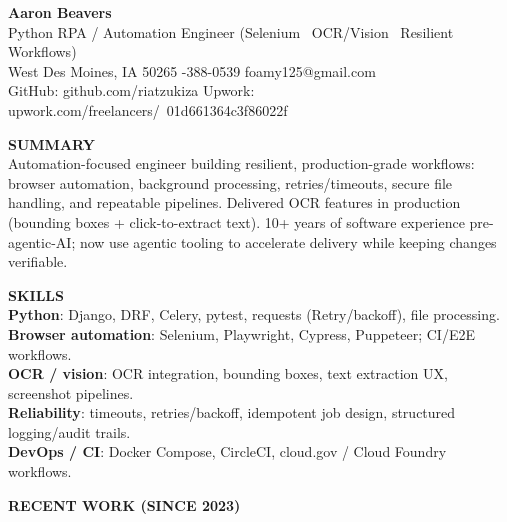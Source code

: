 \documentclass[10pt]{article}
\begin{document}
{\LARGE \textbf{Aaron Beavers}}\\
Python RPA / Automation Engineer (Selenium \textbullet\ OCR/Vision \textbullet\ Resilient Workflows)\\

West Des Moines, IA 50265 \;\;\textbar\;-388-0539 \;\;\textbar\;\; foamy125@gmail.com\\
GitHub: github.com/riatzukiza \;\;\textbar\;\; Upwork: upwork.com/freelancers/~01d661364c3f86022f

\vspace{6pt}
\textbf{SUMMARY}\\
Automation-focused engineer building resilient, production-grade workflows: browser automation, background processing, retries/timeouts, secure file handling, and repeatable pipelines. Delivered OCR features in production (bounding boxes + click-to-extract text). 10+ years of software experience pre-agentic-AI; now use agentic tooling to accelerate delivery while keeping changes verifiable.

\vspace{2pt}
\textbf{SKILLS}\\
\textbf{Python}: Django, DRF, Celery, pytest, requests (Retry/backoff), file processing.\\
\textbf{Browser automation}: Selenium, Playwright, Cypress, Puppeteer; CI/E2E workflows.\\
\textbf{OCR / vision}: OCR integration, bounding boxes, text extraction UX, screenshot pipelines.\\
\textbf{Reliability}: timeouts, retries/backoff, idempotent job design, structured logging/audit trails.\\
\textbf{DevOps / CI}: Docker Compose, CircleCI, cloud.gov / Cloud Foundry workflows.

\vspace{6pt}
\textbf{RECENT WORK (SINCE 2023)}\\
\end{document}
